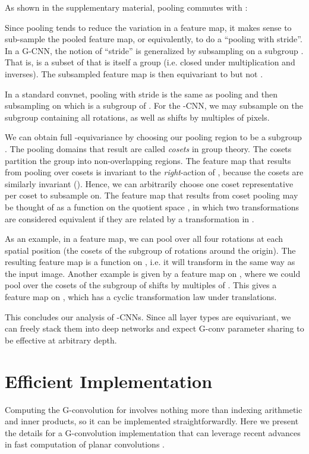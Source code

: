 \documentclass{article}
\begin{document}
As shown in the supplementary material, pooling commutes with :



Since pooling tends to reduce the variation in a feature map, it makes sense to sub-sample the pooled feature map, or equivalently, to do a ``pooling with stride''.
In a G-CNN, the notion of ``stride'' is generalized by subsampling on a subgroup .
That is,  is a subset of  that is itself a group (i.e. closed under multiplication and inverses).
The subsampled feature map is then equivariant to  but not .

In a standard convnet, pooling with stride  is the same as pooling and then subsampling on  which is a subgroup of .
For the -CNN, we may subsample on the subgroup  containing all  rotations, as well as shifts by multiples of  pixels.

We can obtain full -equivariance by choosing our pooling region  to be a subgroup .
The pooling domains  that result are called \emph{cosets} in group theory.
The cosets partition the group into non-overlapping regions.
The feature map that results from pooling over cosets is invariant to the \emph{right}-action of , because the cosets are similarly invariant ().
Hence, we can arbitrarily choose one coset representative per coset to subsample on.
The feature map that results from coset pooling may be thought of as a function on the quotient space ,
in which two transformations are considered equivalent if they are related by a transformation in .

As an example, in a  feature map, we can pool over all four rotations at each spatial position (the cosets of the subgroup  of rotations around the origin).
The resulting feature map is a function on , i.e. it will transform in the same way as the input image.
Another example is given by a feature map on , where we could pool over the cosets of the subgroup  of shifts by multiples of .
This gives a feature map on , which has a cyclic transformation law under translations.

This concludes our analysis of -CNNs.
Since all layer types are equivariant, we can freely stack them into deep networks and expect G-conv parameter sharing to be effective at arbitrary depth.


\section{Efficient Implementation}
\label{sec:implementation}

Computing the G-convolution for involves nothing more than indexing arithmetic and inner products, so it can be implemented straightforwardly.
Here we present the details for a G-convolution implementation that can leverage recent advances in fast computation of planar convolutions \cite{Mathieu2014, Vasilache2015, Lavin2015}.
\end{document}
